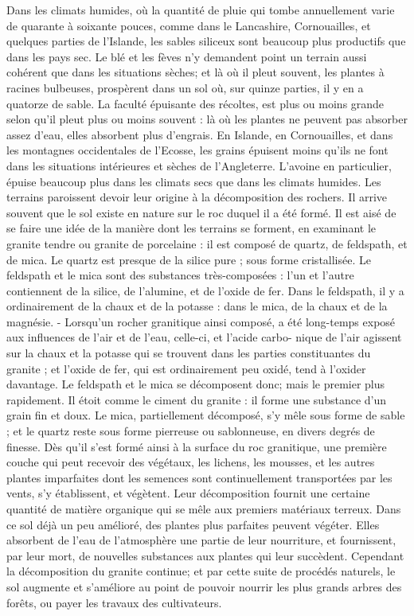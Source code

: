 Dans les climats humides, où la quantité de pluie qui tombe annuellement varie de quarante à soixante pouces, comme dans le Lancashire, Cornouailles, et quelques parties de l'Islande, les sables siliceux sont beaucoup plus productifs que dans les pays sec. Le blé et les fèves n'y demandent point un terrain aussi cohérent que dans les situations sèches; et là où il pleut souvent, les plantes à racines bulbeuses, prospèrent dans un sol où, sur quinze parties, il y en a quatorze de sable.
La faculté épuisante des récoltes, est plus\setcounter{page}{467} ou moins grande selon qu'il pleut plus ou
moins souvent : là où les plantes ne peuvent
pas absorber assez d'eau, elles absorbent plus
d'engrais. En Islande, en Cornouailles, et
dans les montagnes occidentales de l'Ecosse,
les grains épuisent moins qu'ils ne font dans
les situations intérieures et sèches de l'Angleterre. L'avoine en particulier, épuise beaucoup plus dans les climats secs que dans les
climats humides.
Les terrains paroissent devoir leur origine
à la décomposition des rochers. Il arrive
souvent que le sol existe en nature sur le
roc duquel il a été formé. Il est aisé de se
faire une idée de la manière dont les terrains se forment, en examinant le granite
tendre ou granite de porcelaine : il est composé de quartz, de feldspath, et de mica.
Le quartz est presque de la silice pure ;
sous forme cristallisée. Le feldspath et le mica
sont des substances très-composées : l'un et
l'autre contiennent de la silice, de l'alumine,
et de l'oxide de fer. Dans le feldspath, il
y a ordinairement de la chaux et de la potasse : dans le mica, de la chaux et de la
magnésie.
- Lorsqu'un rocher granitique ainsi composé,
a été long-temps exposé aux influences de
l'air et de l'eau, celle-ci, et l'acide carbo-\setcounter{page}{468} nique de l'air agissent sur la chaux et la potasse qui se trouvent dans les parties constituantes du granite ; et l'oxide de fer, qui est ordinairement peu oxidé, tend à l'oxider davantage. Le feldspath et le mica se décomposent donc; mais le premier plus rapidement. Il étoit comme le ciment du granite : il forme une substance d'un grain fin et doux. Le mica, partiellement décomposé, s'y mêle sous forme de sable ; et le quartz reste sous forme pierreuse ou sablonneuse, en divers degrés de finesse. Dès qu'il s'est formé ainsi à la surface du roc granitique, une première couche qui peut recevoir des végétaux, les lichens, les mousses, et les autres plantes imparfaites dont les semences sont continuellement transportées par les vents, s'y établissent, et végètent. Leur décomposition fournit une certaine quantité de matière organique qui se mêle aux premiers matériaux terreux. Dans ce sol déjà un peu amélioré, des plantes plus parfaites peuvent végéter. Elles absorbent de l'eau de l'atmosphère une partie de leur nourriture, et fournissent, par leur mort, de nouvelles substances aux plantes qui leur succèdent. Cependant la décomposition du granite continue; et par cette suite de procédés naturels, le sol augmente et s'améliore\setcounter{page}{469} au point de pouvoir nourrir les plus grands arbres des forêts, ou payer les travaux des cultivateurs.
